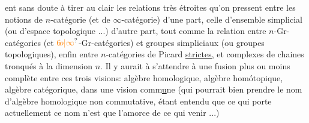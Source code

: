 

ent sans doute à tirer au clair les relations très étroites qu'on pressent entre les notions de $n$-catégorie (et de $\infty$-catégorie) d'une part, celle d'ensemble simplicial (ou d'espace topologique ...) d'autre part, tout comme la relation entre $n$-Gr-catégories (et $\unsure{6\!o|\infty}$-Gr-catégories) et groupes simpliciaux (ou groupes topologiques), enfin entre   $n$-catégories de Picard \uline{strictes,} et  complexes de chaines tronqués à la dimension $n$. Il y aurait à s'attendre à une fusion plus ou moins complète entre ces trois visions: algèbre homologique, algèbre homótopique, algèbre catégorique, dans une vision comm\uline{u}ne (qui pourrait bien prendre le nom d'algèbre homologique non commutative, étant entendu que ce qui porte actuellement ce nom n'est que l'amorce de ce qui   venir ...)

